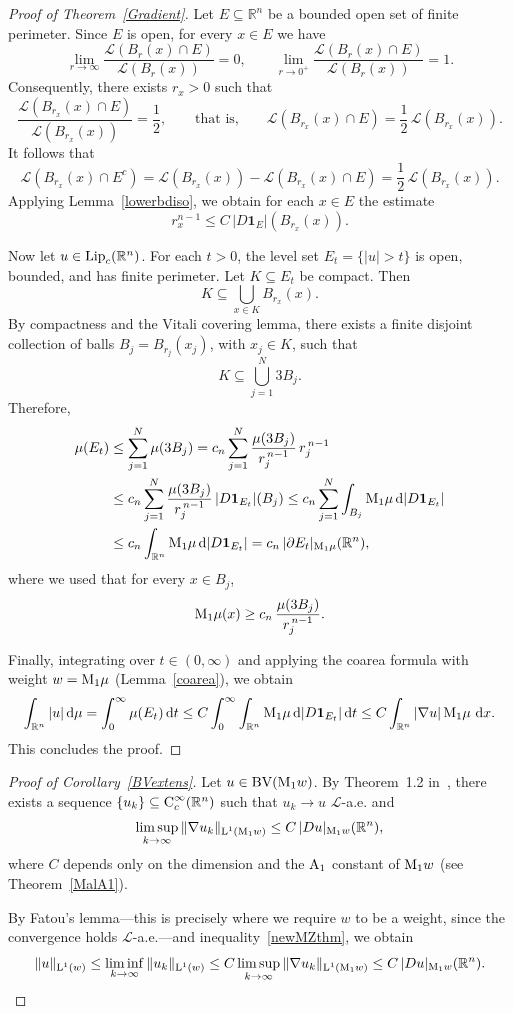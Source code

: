 \documentclass[11pt, a4paper, reqno]{amsart}
\newcommand{\R}{\mathbb R}
\newcommand{\A}{\textup A}
\newcommand{\dx}{\,{\mathrm dx}}
\newcommand{\Lup}{\textup{L}}
\newcommand{\BV}{\textup{BV}}
\newcommand{\Con}{\textup{C}}
\DeclareMathOperator{\Lip}{\textup{Lip}}
\theoremstyle{definition}
\theoremstyle{remark}
\begin{document}
\begin{proof}[Proof of Theorem~\ref{Gradient}]
Let $E\subseteq \R^n$ be a bounded open set of finite perimeter. Since $E$ is open, for every $x\in E$ we have
\[
\lim_{r\to\infty}\frac{\mathcal L(B_r(x)\cap E)}{\mathcal L(B_r(x))}=0,
\qquad
\lim_{r\to 0^+}\frac{\mathcal L(B_r(x)\cap E)}{\mathcal L(B_r(x))}=1.
\]
Consequently, there exists $r_x>0$ such that
\[
\frac{\mathcal L(B_{r_x}(x)\cap E)}{\mathcal L(B_{r_x}(x))}=\frac12,
\qquad\text{that is,}\qquad
\mathcal L(B_{r_x}(x)\cap E)=\frac12\,\mathcal L(B_{r_x}(x)).
\]
It follows that
\[
\mathcal L(B_{r_x}(x)\cap E^c)
=\mathcal L(B_{r_x}(x))-\mathcal L(B_{r_x}(x)\cap E)
=\frac12\,\mathcal L(B_{r_x}(x)).
\]
Applying Lemma~\ref{lowerbdiso}, we obtain for each $x\in E$ the estimate
\[
r_x^{n-1}\le C\,|D\mathbf 1_E|(B_{r_x}(x)).
\]

Now let $u\in \Lip_c(\R^n)$. For each $t>0$, the level set $E_t=\{|u|>t\}$ is open, bounded, and has finite perimeter. Let $K\subseteq E_t$ be compact. Then
\[
K\subseteq \bigcup_{x\in K} B_{r_x}(x).
\]
By compactness and the Vitali covering lemma, there exists a finite disjoint collection of balls $B_j=B_{r_j}(x_j)$, with $x_j\in K$, such that
\[
K\subseteq \bigcup_{j=1}^N 3B_j.
\]
Therefore,
\begin{align*}
\mu(E_t)
&\le \sum_{j=1}^N \mu(3B_j)
= c_n\sum_{j=1}^N \frac{\mu(3B_j)}{r_j^{\,n-1}}\, r_j^{\,n-1} \\
&\le c_n\sum_{j=1}^N \frac{\mu(3B_j)}{r_j^{\,n-1}}\,
|D\mathbf 1_{E_t}|(B_j)
\le c_n\sum_{j=1}^N \int_{B_j} \textup{M}_1\mu\,\mathrm d|D\mathbf 1_{E_t}| \\
&\le c_n\int_{\R^n} \textup{M}_1\mu\,\mathrm d|D\mathbf 1_{E_t}|
= c_n\,|\partial E_t|_{\textup{M}_1\mu}(\R^n),
\end{align*}
where we used that for every $x\in B_j$,
\[
\textup{M}_1\mu(x)\ge c_n\,\frac{\mu(3B_j)}{r_j^{\,n-1}}.
\]

Finally, integrating over $t\in(0,\infty)$ and applying the coarea formula with weight $w=\textup{M}_1\mu$ (Lemma~\eqref{coarea}), we obtain
\[
\int_{\R^n} |u|\,\mathrm d\mu
= \int_0^\infty \mu(E_t)\,\mathrm dt
\le C\int_0^\infty \int_{\R^n} \textup{M}_1\mu\,\mathrm d|D\mathbf 1_{E_t}|\,\mathrm dt
\le C\int_{\R^n} |\nabla u|\,\textup{M}_1\mu\,\dx.
\]
This concludes the proof.
\end{proof}

\begin{proof}[Proof of Corollary~\ref{BVextens}]
Let $u \in \BV(\textup{M}_1 w)$. By Theorem~1.2 in~\cite{BGKM}, there exists a sequence $\{u_k\}\subseteq \Con_c^\infty(\R^n)$ such that $u_k\to u$ $\mathcal L$-a.e. and
\[
\limsup_{k\to\infty} \|\nabla u_k\|_{\Lup^1(\textup{M}_1 w)}
\le C\, |Du|_{\textup{M}_1 w}(\R^n),
\]
where $C$ depends only on the dimension and the $\A_1$ constant of $\textup{M}_1 w$ (see Theorem~\ref{MalA1}).

By Fatou’s lemma—this is precisely where we require $w$ to be a weight, since the convergence holds $\mathcal L$-a.e.—and inequality~\eqref{newMZthm}, we obtain
\[
\|u\|_{\Lup^1(w)}
\le \liminf_{k\to\infty} \|u_k\|_{\Lup^1(w)}
\le C \limsup_{k\to\infty} \|\nabla u_k\|_{\Lup^1(\textup{M}_1 w)}
\le C\, |Du|_{\textup{M}_1 w}(\R^n).
\]
\end{proof}
\end{document}
